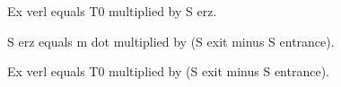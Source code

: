 Ex verl equals T0 multiplied by S erz.  

S erz equals m dot multiplied by (S exit minus S entrance).  

Ex verl equals T0 multiplied by (S exit minus S entrance).